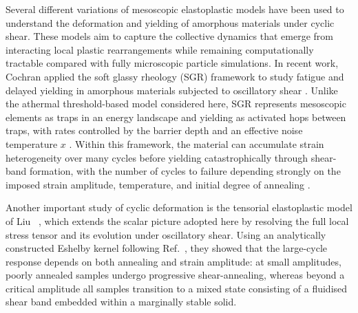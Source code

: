 \documentclass[asymmetricmargins]{library/duthesis}%
\begin{document}
Several different variations of mesoscopic elastoplastic models have been used to understand the deformation and yielding of amorphous materials under cyclic shear. These models aim to capture the collective dynamics that emerge from interacting local plastic rearrangements while remaining computationally tractable compared with fully microscopic particle simulations. In recent work, Cochran \etal applied the soft glassy rheology (SGR) framework to study fatigue and delayed yielding in amorphous materials subjected to oscillatory shear \cite{cochran_slow_2024}. Unlike the athermal threshold-based model considered here, SGR represents mesoscopic elements as traps in an energy landscape and yielding as activated hops between traps, with rates controlled by the barrier depth and an effective noise temperature $x$ \cite{sollich_rheological_1998,sollich_rheology_1997}. Within this framework, the material can accumulate strain heterogeneity over many cycles before yielding catastrophically through shear-band formation, with the number of cycles to failure depending strongly on the imposed strain amplitude, temperature, and initial degree of annealing \cite{cochran_slow_2024}.

Another important study of cyclic deformation is the tensorial elastoplastic model of Liu \etal~\cite{liuFateShearoscillatedAmorphous2022}, which extends the scalar picture adopted here by resolving the full local stress tensor and its evolution under oscillatory shear. Using an analytically constructed Eshelby kernel following Ref.~\cite{caoSoftModesStrain2018}, they showed that the large-cycle response depends on both annealing and strain amplitude: at small amplitudes, poorly annealed samples undergo progressive shear-annealing, whereas beyond a critical amplitude all samples transition to a mixed state consisting of a fluidised shear band embedded within a marginally stable solid.
\end{document}

